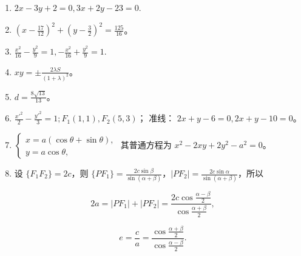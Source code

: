 \begin{enumerate}
\def\labelenumi{\arabic{enumi}.}
\item
  \(2x - 3y + 2 = 0, 3x + 2y - 23 = 0.\)
\item
  \(\left(x - \frac{17}{12}\right)^2 + \left(y - \frac{3}{2}\right)^2 = \frac{125}{16}\)。
\item
  \(\frac{x^2}{16} - \frac{y^2}{9} = 1, -\frac{x^2}{16} + \frac{y^2}{9} = 1.\)
\item
  \(xy = \pm \frac{2\lambda S}{(1 + \lambda)^2}\)。
\item
  \(d = \frac{8\sqrt{13}}{13}\)。
\item
  \(\frac{x'^{2}}{2} - \frac{y'^{2}}{3} = 1; F_1(1, 1), F_2(5, 3)\)；
  准线： \(2x + y - 6 = 0, 2x + y - 10 = 0\)。
\item
  \(\left\{ \begin{array}{l} x = a (\cos \theta + \sin \theta), \\ y = a \cos \theta, \end{array} \right.\)
  其普通方程为 \(x^{2} - 2xy + 2y^{2} - a^{2} = 0\)。
\item
  设 \(\{F_1F_2\} = 2c\)，则
  \(\{PF_1\} = \frac{2c\sin\beta}{\sin(\alpha + \beta)}\)，\(|PF_2| = \frac{2c\sin\alpha}{\sin(\alpha + \beta)}\)，所以
\end{enumerate}

\[
2 a = | PF_{1} | + | PF_{2} | = \frac {2 c \cos \frac {\alpha - \beta}{2}}{\cos \frac {\alpha + \beta}{2}},
\]

\[
e = \frac {c}{a} = \frac {\cos \frac {\alpha + \beta}{2}}{\cos \frac {\alpha - \beta}{2}}.
\]
